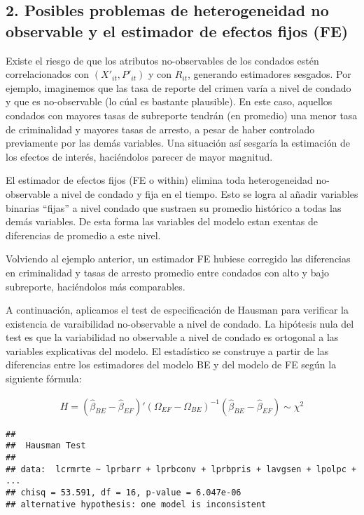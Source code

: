 \documentclass[
]{article}
\begin{document}
\hypertarget{posibles-problemas-de-heterogeneidad-no-observable-y-el-estimador-de-efectos-fijos-fe}{%
\subsection{2. Posibles problemas de heterogeneidad no observable y el
estimador de efectos fijos
(FE)}\label{posibles-problemas-de-heterogeneidad-no-observable-y-el-estimador-de-efectos-fijos-fe}}

Existe el riesgo de que los atributos no-observables de los condados
estén correlacionados con \((X'_{it},P'_{it})\) y con \(R_{it}\),
generando estimadores sesgados. Por ejemplo, imaginemos que las tasa de
reporte del crimen varía a nivel de condado y que es no-observable (lo
cúal es bastante plausible). En este caso, aquellos condados con mayores
tasas de subreporte tendrán (en promedio) una menor tasa de criminalidad
y mayores tasas de arresto, a pesar de haber controlado previamente por
las demás variables. Una situación así sesgaría la estimación de los
efectos de interés, haciéndolos parecer de mayor magnitud.

El estimador de efectos fijos (FE o within) elimina toda heterogeneidad
no-observable a nivel de condado y fija en el tiempo. Esto se logra al
añadir variables binarias ``fijas'' a nivel condado que sustraen su
promedio histórico a todas las demás variables. De esta forma las
variables del modelo estan exentas de diferencias de promedio a este
nivel.

Volviendo al ejemplo anterior, un estimador FE hubiese corregido las
diferencias en criminalidad y tasas de arresto promedio entre condados
con alto y bajo subreporte, haciéndolos más comparables.

A continuación, aplicamos el test de especificación de Hausman para
verificar la existencia de varaibilidad no-observable a nivel de
condado. La hipótesis nula del test es que la variabilidad no observable
a nivel de condado es ortogonal a las variables explicativas del modelo.
El estadístico se construye a partir de las diferencias entre los
estimadores del modelo BE y del modelo de FE según la siguiente fórmula:

\begin{gather*}
H = ( \hat \beta_{BE} - \hat \beta_{EF})' (\Omega_{EF}-\Omega_{BE})^{-1}  ( \hat \beta_{BE} - \hat \beta_{EF}) \sim \chi^2
\end{gather*}

\begin{verbatim}
## 
##  Hausman Test
## 
## data:  lcrmrte ~ lprbarr + lprbconv + lprbpris + lavgsen + lpolpc +  ...
## chisq = 53.591, df = 16, p-value = 6.047e-06
## alternative hypothesis: one model is inconsistent
\end{verbatim}
\end{document}
